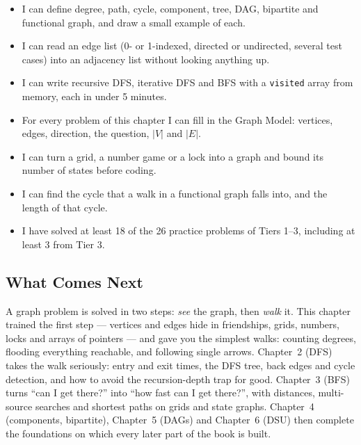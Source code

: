 \begin{checklistbox}
\begin{itemize}[leftmargin=*]
    \item[$\square$] I can define degree, path, cycle, component, tree, DAG, bipartite and functional graph, and draw a small example of each.
    \item[$\square$] I can read an edge list (0- or 1-indexed, directed or undirected, several test cases) into an adjacency list without looking anything up.
    \item[$\square$] I can write recursive DFS, iterative DFS and BFS with a \texttt{visited} array from memory, each in under 5 minutes.
    \item[$\square$] For every problem of this chapter I can fill in the Graph Model: vertices, edges, direction, the question, $|V|$ and $|E|$.
    \item[$\square$] I can turn a grid, a number game or a lock into a graph and bound its number of states before coding.
    \item[$\square$] I can find the cycle that a walk in a functional graph falls into, and the length of that cycle.
    \item[$\square$] I have solved at least 18 of the 26 practice problems of Tiers 1--3, including at least 3 from Tier 3.
\end{itemize}
\end{checklistbox}

\subsection{What Comes Next}

A graph problem is solved in two steps: \emph{see} the graph, then \emph{walk} it. This chapter trained the first step --- vertices and edges hide in friendships, grids, numbers, locks and arrays of pointers --- and gave you the simplest walks: counting degrees, flooding everything reachable, and following single arrows. Chapter~2 (DFS) takes the walk seriously: entry and exit times, the DFS tree, back edges and cycle detection, and how to avoid the recursion-depth trap for good. Chapter~3 (BFS) turns ``can I get there?'' into ``how fast can I get there?'', with distances, multi-source searches and shortest paths on grids and state graphs. Chapter~4 (components, bipartite), Chapter~5 (DAGs) and Chapter~6 (DSU) then complete the foundations on which every later part of the book is built.
